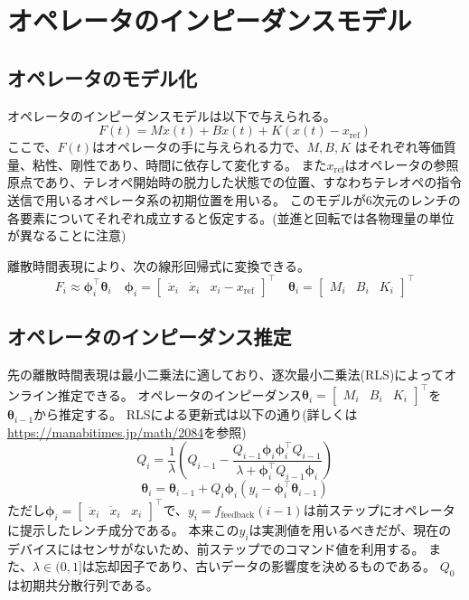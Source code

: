 \documentclass[uplatex]{jsarticle}
\begin{document}
\section{オペレータのインピーダンスモデル}
\subsection{オペレータのモデル化}
オペレータのインピーダンスモデルは以下で与えられる。
\begin{equation}\label{operator_model_eq}
  F(t) = M \ddot{x}(t) + B \dot{x}(t) + K (x(t) - x_{\text{ref}})
\end{equation}
ここで、$F(t)$はオペレータの手に与えられる力で、$M, B, K$ はそれぞれ等価質量、粘性、剛性であり、時間に依存して変化する。
また$x_{\text{ref}}$はオペレータの参照原点であり、テレオペ開始時の脱力した状態での位置、すなわちテレオペの指令送信で用いるオペレータ系の初期位置を用いる。
このモデルが6次元のレンチの各要素についてそれぞれ成立すると仮定する。(並進と回転では各物理量の単位が異なることに注意)

離散時間表現により、次の線形回帰式に変換できる。
\begin{equation}
  F_i \approx \bm{\phi}_i^\top \bm{\theta}_i \quad 
  \bm{\phi}_i = \begin{bmatrix} \ddot{x}_i & \dot{x}_i & x_i - x_{\text{ref}} \end{bmatrix}^\top
  \quad \bm{\theta}_i = \begin{bmatrix} M_i & B_i & K_i \end{bmatrix}^\top
\end{equation}

\subsection{オペレータのインピーダンス推定}
先の離散時間表現は最小二乗法に適しており、逐次最小二乗法(RLS)によってオンライン推定できる。
オペレータのインピーダンス$\bm{\theta}_i = \begin{bmatrix} M_i & B_i & K_i \end{bmatrix}^\top$を$\bm{\theta}_{i-1}$から推定する。
RLSによる更新式は以下の通り(詳しくは\url{https://manabitimes.jp/math/2084}を参照)
\begin{equation}
  Q_i = \frac{1}{\lambda} (Q_{i-1} - \frac{Q_{i-1} \bm{\phi}_i \bm{\phi}_i^\top Q_{i-1}}{\lambda + \bm{\phi}_i^\top Q_{i-1} \bm{\phi}_i})
\end{equation}
\begin{equation}
  \bm{\theta}_i = \bm{\theta}_{i-1} + Q_i \bm{\phi}_i (y_i - \bm{\phi}_i^\top \bm{\theta}_{i-1})
\end{equation}
ただし$\bm{\phi}_i = \begin{bmatrix} \ddot{x}_i & \dot{x}_i & {x}_i \end{bmatrix}^\top$で、$y_i = f_{\text{feedback}}(i-1)$は前ステップにオペレータに提示したレンチ成分である。
本来この$y_i$は実測値を用いるべきだが、現在のデバイスにはセンサがないため、前ステップでのコマンド値を利用する。
また、$\lambda \in (0,1]$は忘却因子であり、古いデータの影響度を決めるものである。
$Q_0$は初期共分散行列である。
\end{document}
